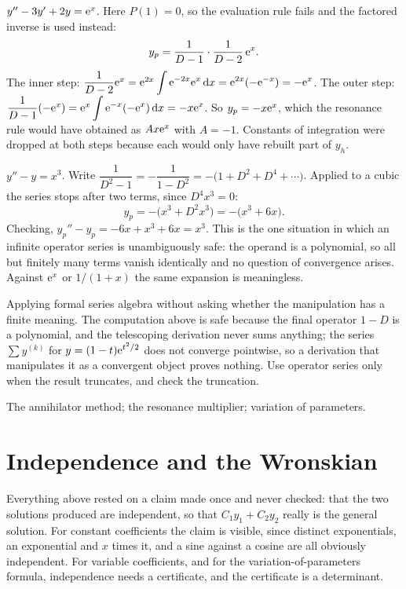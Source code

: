 \begin{worked}
$y''-3y'+2y=\mathrm{e}^{x}$. Here $P(1)=0$, so the evaluation rule fails and the factored inverse is used instead:
\[y_p=\frac{1}{D-1}\cdot\frac{1}{D-2}\,\mathrm{e}^{x}.\]
The inner step: $\dfrac{1}{D-2}\mathrm{e}^{x}=\mathrm{e}^{2x}\displaystyle\int\mathrm{e}^{-2x}\mathrm{e}^{x}\,\mathrm{d} x=\mathrm{e}^{2x}(-\mathrm{e}^{-x})=-\mathrm{e}^{x}$. The outer step: $\dfrac{1}{D-1}(-\mathrm{e}^{x})=\mathrm{e}^{x}\displaystyle\int\mathrm{e}^{-x}(-\mathrm{e}^{x})\,\mathrm{d} x=-x\mathrm{e}^{x}$. So $y_p=-x\mathrm{e}^{x}$, which the resonance rule would have obtained as $Ax\mathrm{e}^{x}$ with $A=-1$. Constants of integration were dropped at both steps because each would only have rebuilt part of $y_h$.
\end{worked}

\begin{worked}
$y''-y=x^{3}$. Write $\dfrac{1}{D^{2}-1}=-\dfrac{1}{1-D^{2}}=-\bigl(1+D^{2}+D^{4}+\cdots\bigr)$. Applied to a cubic the series stops after two terms, since $D^{4}x^{3}=0$:
\[y_p=-\bigl(x^{3}+D^{2}x^{3}\bigr)=-\bigl(x^{3}+6x\bigr).\]
Checking, $y_p''-y_p=-6x+x^{3}+6x=x^{3}$. This is the one situation in which an infinite operator series is unambiguously safe: the operand is a polynomial, so all but finitely many terms vanish identically and no question of convergence arises. Against $\mathrm{e}^{x}$ or $1/(1+x)$ the same expansion is meaningless.
\end{worked}

\begin{trap}
Applying formal series algebra without asking whether the manipulation has a finite meaning. The computation above is safe because the final operator $1-D$ is a polynomial, and the telescoping derivation never sums anything; the series $\sum y^{(k)}$ for $y=(1-t)\mathrm{e}^{t^{2}/2}$ does not converge pointwise, so a derivation that manipulates it as a convergent object proves nothing. Use operator series only when the result truncates, and check the truncation.
\end{trap}

\begin{seealsob}The annihilator method; the resonance multiplier; variation of parameters.\end{seealsob}

\section{Independence and the Wronskian}

Everything above rested on a claim made once and never checked: that the two solutions produced are independent, so that $C_1y_1+C_2y_2$ really is the general solution. For constant coefficients the claim is visible, since distinct exponentials, an exponential and $x$ times it, and a sine against a cosine are all obviously independent. For variable coefficients, and for the variation-of-parameters formula, independence needs a certificate, and the certificate is a determinant.

